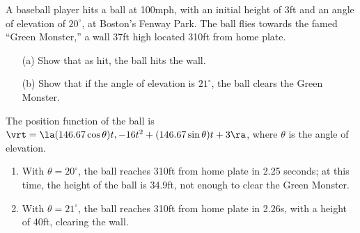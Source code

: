 {A baseball player hits a ball at 100mph, with an initial height of 3ft and an angle of elevation of $20^\circ$, at Boston's Fenway Park. The ball flies towards the famed ``Green Monster,'' a wall 37ft high located 310ft from home plate. 
\begin{enumerate}
	\item [(a)] Show that as hit, the ball hits the wall.
	\item [(b)] Show that if the angle of elevation is $21^\circ$, the ball clears the Green Monster.
\end{enumerate}
}
{The position function of the ball is $\vrt = \la (146.67\cos\theta)t,-16t^2+(146.67\sin\theta)t+3\ra$, where $\theta$ is the angle of elevation.
\begin{enumerate}
	\item With $\theta=20^\circ$, the ball reaches 310ft from home plate in 2.25 seconds; at this time, the height of the ball is 34.9ft, not enough to clear the Green Monster.
	\item	With $\theta=21^\circ$, the ball reaches 310ft from home plate in 2.26s, with a height of 40ft, clearing the wall.
\end{enumerate}
}